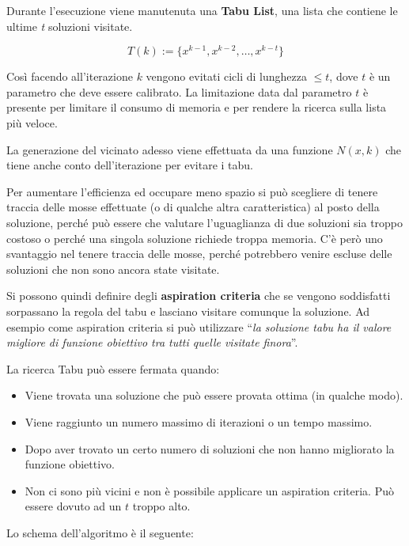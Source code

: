 Durante l'esecuzione viene manutenuta una \textbf{Tabu List}, una lista che contiene le ultime \textit{t} soluzioni visitate.

$$
T(k) := \{x^{k-1}, x^{k-2}, \ldots, x^{k-t} \}
$$

\noindent Così facendo all'iterazione $k$ vengono evitati cicli di lunghezza $\leq t$, dove $t$ è un parametro che deve essere calibrato.
La limitazione data dal parametro $t$ è presente per limitare il consumo di memoria e per rendere la ricerca sulla lista più veloce.

La generazione del vicinato adesso viene effettuata da una funzione $N(x,k)$ che tiene anche conto dell'iterazione per evitare i tabu.

Per aumentare l'efficienza ed occupare meno spazio si può scegliere di tenere traccia delle mosse effettuate (o di qualche altra caratteristica) al posto della soluzione, perché può essere che valutare l'uguaglianza di due soluzioni sia troppo costoso o perché una singola soluzione richiede troppa memoria.
C'è però uno svantaggio nel tenere traccia delle mosse, perché potrebbero venire escluse delle soluzioni che non sono ancora state visitate.

Si possono quindi definire degli \textbf{aspiration criteria} che se vengono soddisfatti sorpassano la regola del tabu e lasciano visitare comunque la soluzione. Ad esempio come aspiration criteria si può utilizzare ``\textit{la soluzione tabu ha il valore migliore di funzione obiettivo tra tutti quelle visitate finora}''.

La ricerca Tabu può essere fermata quando:

\begin{itemize}
	\item Viene trovata una soluzione che può essere provata ottima (in qualche modo).
	\item Viene raggiunto un numero massimo di iterazioni o un tempo massimo.
	\item Dopo aver trovato un certo numero di soluzioni che non hanno migliorato la funzione obiettivo.
	\item Non ci sono più vicini e non è possibile applicare un aspiration criteria. Può essere dovuto ad un $t$ troppo alto.
\end{itemize}

\noindent Lo schema dell'algoritmo è il seguente:

